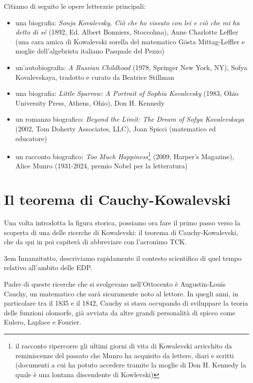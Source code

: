 Citiamo di seguito le opere letterarie principali:
\begin{itemize}

\item una biografia: \textit{Sonja Kovalevsky. Ciò che ho vissuto con lei e ciò che mi ha detto di sé} (1892, Ed. Albert
Bonniers, Stoccolma), Anne Charlotte Leffler (una cara amica di Kowalevski sorella del matematico Gösta Mittag-Leffler e moglie dell'algebrista italiano Pasquale del Pezzo)

\item un'autobiografia: \textit{A Russian Childhood} (1978, Springer New York, NY), Sofya Kovalevskaya, tradotto e curato da Beatrice Stillman

\item una biografia: \textit{Little Sparrow: A Portrait of Sophia Kovalevsky} (1983,
Ohio University Press, Athens, Ohio), Don H. Kennedy

\item un romanzo biografico: \textit{Beyond the Limit: The Dream of Sofya Kovalevskaya} (2002, Tom
Doherty Associates, LLC), Joan Spicci (matematico ed educatore)

\item un racconto biografico: \textit{Too Much Happiness}\footnote{ il racconto ripercorre gli ultimi giorni
di vita di Kowalevski arricchito da reminiscenze del passato
che Munro ha acquisito da lettere, diari e scritti (documenti a cui ha potuto
accedere tramite la moglie di Don H. Kennedy la quale è una lontana discendente di Kowlevski)} 
(2009, Harper's Magazine), Alice Munro (1931-2024, premio Nobel per la letteratura)

\end{itemize}

\section{Il teorema di Cauchy-Kowalevski}

Una volta introdotta la figura storica, possiamo ora fare il primo passo verso la scoperta di una delle ricerche di Kowalevski: il teorema di Cauchy-Kowalevski, che da qui in poi capiterà di abbreviare con l'acronimo TCK.

\emergencystretch 3em
Innanzitutto, descriviamo rapidamente il contesto scientifico di quel tempo relativo all'ambito delle EDP. 

Padre di queste ricerche che si svolgevano nell'Ottocento è Augustin-Louis Cauchy, un matematico che sarà sicuramente noto al lettore. In quegli anni, in particolare tra il 1835 e il 1842, Cauchy si stava occupando di sviluppare la teoria delle funzioni olomorfe, già avviata da altre grandi personalità di spicco come Eulero, Laplace e Fourier.

